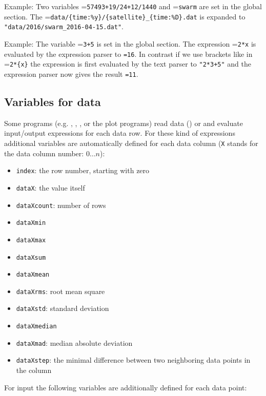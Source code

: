 Example:
Two variables =\verb|57493+19/24+12/1440| and =\verb|swarm| are
set in the global section. The =\verb|data/{time:%y}/{satellite}_{time:%D}.dat|
is expanded to \verb|"data/2016/swarm_2016-04-15.dat"|.

Example:
The variable =\verb|3+5| is set in the global section.
The expression =\verb|2*x| is evaluated by the expression parser to \verb|=16|.
In contrast if we use brackets like in =\verb|2*{x}| the expression is first evaluated
by the text parser to \verb|"2*3+5"| and the expression parser now gives the result \verb|=11|.


\subsection{Variables for data}\label{general.parser:dataVariables}
Some programs (e.g. , ,
, or the plot programs)
read data () or 
and evaluate input/output expressions for each data row.
For these kind of expressions additional variables are automatically defined for each data column
(\verb|X| stands for the data column number: $0\ldots n$):
\begin{itemize}
\item \verb|index|: the row number, starting with zero
\item \verb|dataX|: the value itself
\item \verb|dataXcount|: number of rows
\item \verb|dataXmin|
\item \verb|dataXmax|
\item \verb|dataXsum|
\item \verb|dataXmean|
\item \verb|dataXrms|: root mean square
\item \verb|dataXstd|: standard deviation
\item \verb|dataXmedian|
\item \verb|dataXmad|: median absolute deviation
\item \verb|dataXstep|: the minimal difference between two neighboring data points in the column
\end{itemize}
For  input the following variables are additionally defined for each data point:
